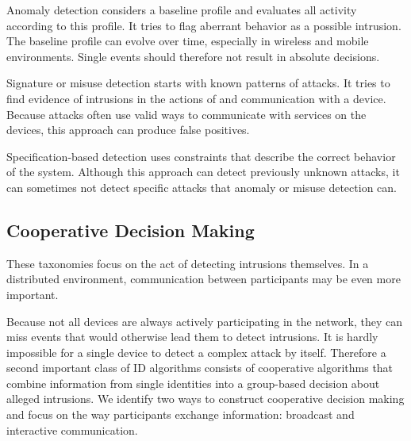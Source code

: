 \documentclass[conference]{IEEEtran}
\begin{document}
\begin{LaTeXdescription}
  
  \item[Anomaly detection] considers a baseline profile and evaluates all
  activity according to this profile. It tries to flag aberrant behavior as a
  possible intrusion. The baseline profile can evolve over time, especially in
  wireless and mobile environments. Single events should therefore not result
  in absolute decisions.
  
  \item[Signature or misuse detection] starts with known patterns of attacks.
  It tries to find evidence of intrusions in the actions of and communication
  with a device. Because attacks often use valid ways to communicate with
  services on the devices, this approach can produce false positives.
  
  \item[Specification-based detection] uses constraints that describe the
  correct behavior of the system. Although this approach can detect previously
  unknown attacks, it can sometimes not detect specific attacks that anomaly or
  misuse detection can.
  
\end{LaTeXdescription}

\subsection{Cooperative Decision Making}
\label{coorperative}

These taxonomies focus on the act of detecting intrusions themselves. In a
distributed environment, communication between participants may be even more
important.

Because not all devices are always actively participating in the network, they
can miss events that would otherwise lead them to detect intrusions. It is
hardly impossible for a single device to detect a complex attack by itself.
Therefore a second important class of ID algorithms consists of cooperative
algorithms that combine information from single identities into a group-based
decision about alleged intrusions. We identify two ways to construct
cooperative decision making and focus on the way participants exchange
information: broadcast and interactive communication.
\end{document}
